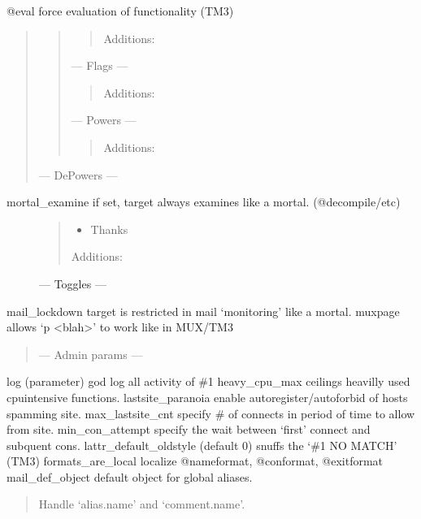 \documentclass[letterpaper,10pt,english]{sphinxmanual}
\begin{document}
\sphinxAtStartPar
@eval \sphinxhyphen{} force evaluation of functionality (TM3)
\begin{quote}
\begin{quote}
\begin{quote}

\sphinxAtStartPar
Additions:
\end{quote}

\sphinxAtStartPar
— Flags —
\begin{quote}

\sphinxAtStartPar
Additions:
\end{quote}

\sphinxAtStartPar
— Powers —
\begin{quote}

\sphinxAtStartPar
Additions:
\end{quote}
\end{quote}

\sphinxAtStartPar
— De\sphinxhyphen{}Powers —
\end{quote}
\begin{description}
\item[{mortal\_examine \sphinxhyphen{} if set, target always examines like a mortal. (@decompile/etc)}] \leavevmode\begin{quote}
\begin{itemize}
\item {} 
\sphinxAtStartPar
Thanks 

\end{itemize}

\sphinxAtStartPar
Additions:
\end{quote}

\sphinxAtStartPar
— Toggles —

\end{description}

\sphinxAtStartPar
mail\_lockdown \sphinxhyphen{} target is restricted in mail ‘monitoring’ like a mortal.
muxpage \sphinxhyphen{} allows ‘p \textless{}blah\textgreater{}’ to work like in MUX/TM3
\begin{quote}

\sphinxAtStartPar
— Admin params —
\end{quote}

\sphinxAtStartPar
log (parameter) god \sphinxhyphen{} log all activity of \#1
heavy\_cpu\_max \sphinxhyphen{} ceilings heavilly used cpu\sphinxhyphen{}intensive functions.
lastsite\_paranoia \sphinxhyphen{} enable auto\sphinxhyphen{}register/auto\sphinxhyphen{}forbid of hosts spamming site.
max\_lastsite\_cnt \sphinxhyphen{} specify \# of connects in period of time to allow from site.
min\_con\_attempt \sphinxhyphen{} specify the wait between ‘first’ connect and subquent cons.
lattr\_default\_oldstyle \sphinxhyphen{} (default 0) snuffs the ‘\#\sphinxhyphen{}1 NO MATCH’ (TM3)
formats\_are\_local \sphinxhyphen{} localize @nameformat, @conformat, @exitformat
mail\_def\_object \sphinxhyphen{} default object for global aliases.
\begin{quote}

\sphinxAtStartPar
Handle ‘alias.name’ and ‘comment.name’.
\end{quote}
\end{document}
